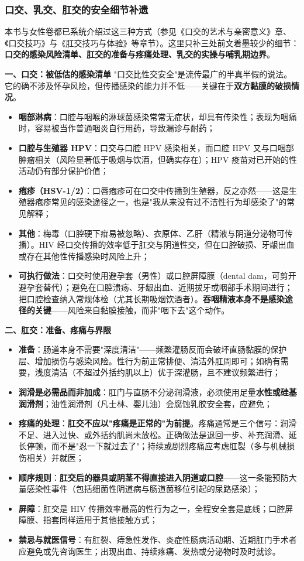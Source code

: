 \subsubsection{口交、乳交、肛交的安全细节补遗}

本书与女性卷都已系统介绍过这三种方式（参见《口交的艺术与亲密意义》章、《口交技巧》与《肛交技巧与体验》等章节）。这里只补三处前文着墨较少的细节：\textbf{口交的感染风险清单、肛交的准备与疼痛处理、乳交的实操与哺乳期边界}。

\textbf{一、口交：被低估的感染清单}
"口交比性交安全"是流传最广的半真半假的说法。它的确不涉及怀孕风险，但传播感染的能力并不低——关键在于\textbf{双方黏膜的破损情况}。
\begin{itemize}
\item \textbf{咽部淋病}：口腔与咽喉的淋球菌感染常常无症状，却具有传染性；表现为咽痛时，容易被当作普通咽炎自行用药，导致漏诊与耐药；
\item \textbf{口腔与生殖器 HPV}：口交与口腔 HPV 感染相关，而口腔 HPV 又与口咽部肿瘤相关（风险显著低于吸烟与饮酒，但确实存在）；HPV 疫苗对已开始的性活动仍有部分保护价值；
\item \textbf{疱疹（HSV-1/2）}：口唇疱疹可在口交中传播到生殖器，反之亦然——这是生殖器疱疹常见的感染途径之一，也是"我从来没有过不洁性行为却感染了"的常见解释；
\item \textbf{其他}：梅毒（口腔硬下疳易被忽略）、衣原体、乙肝（精液与阴道分泌物可传播）。HIV 经口交传播的效率低于肛交与阴道性交，但在口腔破损、牙龈出血或存在其他性传播感染时风险上升；
\item \textbf{可执行做法}：口交时使用避孕套（男性）或口腔屏障膜（dental dam，可剪开避孕套替代）；避免在口腔溃疡、牙龈出血、近期拔牙或咽部手术期间进行；把口腔检查纳入常规体检（尤其长期吸烟饮酒者）。\textbf{吞咽精液本身不是感染途径的关键}——风险来自黏膜接触，而非"咽下去"这个动作。
\end{itemize}

\textbf{二、肛交：准备、疼痛与界限}
\begin{itemize}
\item \textbf{准备}：肠道本身不需要"深度清洁"——频繁灌肠反而会破坏直肠黏膜的保护层、增加损伤与感染风险。性行为前正常排便、清洁外肛周即可；如确有需要，浅度清洁（不超过外括约肌以上）优于深灌肠，且不建议频繁进行；
\item \textbf{润滑是必需品而非加成}：肛门与直肠不分泌润滑液，必须使用足量\textbf{水性或硅基润滑剂}；油性润滑剂（凡士林、婴儿油）会腐蚀乳胶安全套，应避免；
\item \textbf{疼痛的处理}：\textbf{肛交不应以"疼痛是正常的"为前提}。疼痛通常是三个信号：润滑不足、进入过快、或外括约肌尚未放松。正确做法是退回一步、补充润滑、延长停顿，而不是"忍一下就过去了"；持续或剧烈疼痛应考虑肛裂（多与机械损伤相关）并就医；
\item \textbf{顺序规则}：\textbf{肛交后的器具或阴茎不得直接进入阴道或口腔}——这一条能预防大量感染性事件（包括细菌性阴道病与肠道菌移位引起的尿路感染）；
\item \textbf{屏障}：肛交是 HIV 传播效率最高的性行为之一，全程安全套是底线；口腔屏障膜、指套同样适用于其他接触方式；
\item \textbf{禁忌与就医信号}：有肛裂、痔急性发作、炎症性肠病活动期、近期肛门手术者应避免或先咨询医生；出现出血、持续疼痛、发热或分泌物时及时就诊。
\end{itemize}

